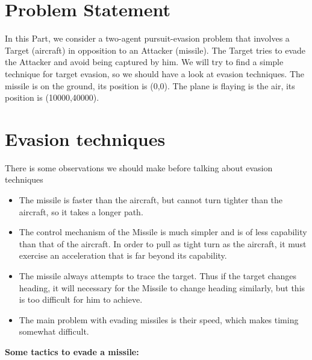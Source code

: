 \section{Problem Statement}
In this Part, we consider a two-agent pursuit-evasion problem that involves  a Target (aircraft) in opposition to an Attacker (missile). The Target tries to evade the Attacker and avoid being captured by him. We will try to find a simple technique for target evasion, so we should have a look at evasion techniques.
The missile is on the ground, its position is (0,0). The plane is flaying is the air, its position is (10000,40000).

\section{Evasion techniques}
There is some observations we should make before talking about evasion techniques 
\begin{itemize}
	\item The missile is faster than the aircraft, but cannot turn tighter than the aircraft, so it takes a longer path.
	\item The control mechanism of the Missile is much simpler and is of less capability than that of the aircraft. In order to pull as tight turn as the aircraft, it must exercise an acceleration that is far beyond its capability.
	\item The missile always attempts to trace the target. Thus if the target changes heading, it will necessary for the Missile to change heading similarly, but this is too difficult for him to achieve.
	\item  The main problem with evading missiles is their speed, which makes timing somewhat difficult.
\end{itemize}
\textbf{Some tactics to evade a missile:}
